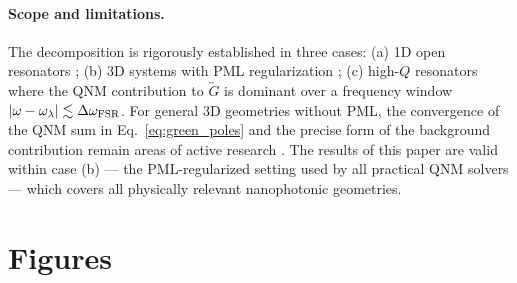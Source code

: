 \documentclass[12pt]{article}
\begin{document}
\paragraph{Scope and limitations.}
The decomposition is rigorously established in three cases: (a) 1D open
resonators \cite{Leung1994,Ching1998}; (b) 3D systems with PML regularization
\cite{Sauvan2013}; (c) high-$Q$ resonators where the QNM contribution
to $\overleftrightarrow{G}$ is dominant over a frequency window
$|\omega-\omega_\lambda|\lesssim\Delta\omega_{\rm FSR}$.  For general
3D geometries without PML, the convergence of the QNM sum in
Eq.~\eqref{eq:green_poles} and the precise form of the background
contribution remain areas of active research \cite{Lalanne2018}.  The
results of this paper are valid within case (b) --- the PML-regularized
setting used by all practical QNM solvers --- which covers all
physically relevant nanophotonic geometries.

\section{Figures}
\label{app:figures}
\end{document}
